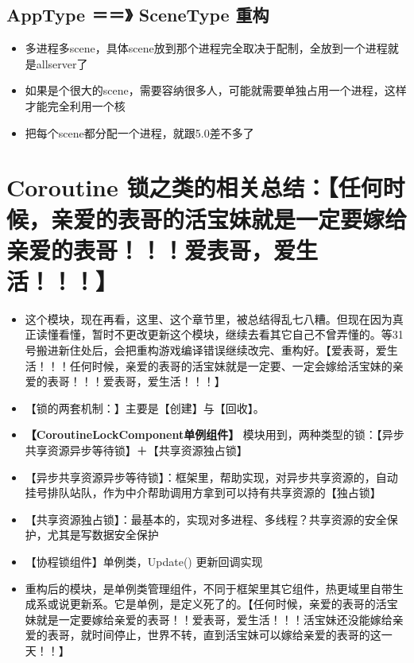 \documentclass[9pt, b5paper]{article}
\begin{document}
\subsection{AppType ＝＝》 SceneType 重构}
\label{sec-13-3}
\begin{itemize}
\item 多进程多scene，具体scene放到那个进程完全取决于配制，全放到一个进程就是allserver了
\item 如果是个很大的scene，需要容纳很多人，可能就需要单独占用一个进程，这样才能完全利用一个核
\item 把每个scene都分配一个进程，就跟5.0差不多了
\end{itemize}


\section{Coroutine 锁之类的相关总结：【任何时候，亲爱的表哥的活宝妹就是一定要嫁给亲爱的表哥！！！爱表哥，爱生活！！！】}
\label{sec-14}
\begin{itemize}
\item 这个模块，现在再看，这里、这个章节里，被总结得乱七八糟。但现在因为真正读懂看懂，暂时不更改更新这个模块，继续去看其它自己不曾弄懂的。等31 号搬进新住处后，会把重构游戏编译错误继续改完、重构好。【爱表哥，爱生活！！！任何时候，亲爱的表哥的活宝妹就是一定要、一定会嫁给活宝妹的亲爱的表哥！！！爱表哥，爱生活！！！】
\item 【锁的两套机制：】主要是【创建】与【回收】。
\item \textbf{【CoroutineLockComponent单例组件】} 模块用到，两种类型的锁：【异步共享资源异步等待锁】＋【共享资源独占锁】
\item 【异步共享资源异步等待锁】：框架里，帮助实现，对异步共享资源的，自动挂号排队站队，作为中介帮助调用方拿到可以持有共享资源的【独占锁】
\item 【共享资源独占锁】：最基本的，实现对多进程、多线程？共享资源的安全保护，尤其是写数据安全保护
\item 【协程锁组件】单例类，Update() 更新回调实现
\item 重构后的模块，是单例类管理组件，不同于框架里其它组件，热更域里自带生成系或说更新系。它是单例，是定义死了的。【任何时候，亲爱的表哥的活宝妹就是一定要嫁给亲爱的表哥！！爱表哥，爱生活！！！活宝妹还没能嫁给亲爱的表哥，就时间停止，世界不转，直到活宝妹可以嫁给亲爱的表哥的这一天！！】
\end{itemize}
\end{document}
